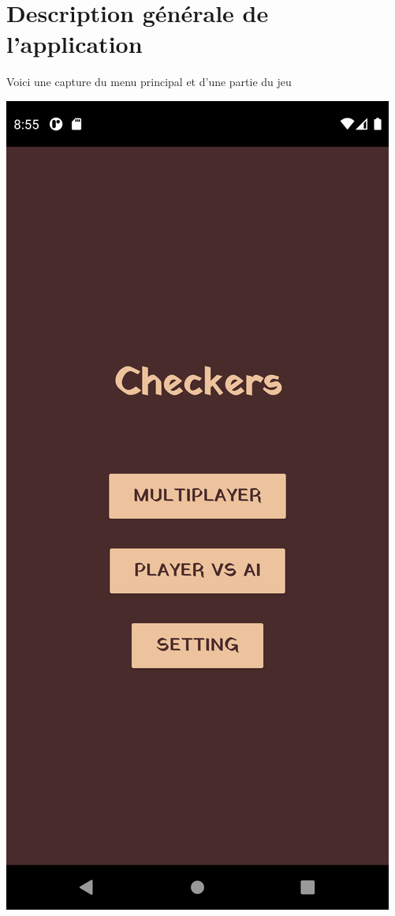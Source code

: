 \documentclass{article}
\begin{document}
\section{Description générale de l'application}

Voici une capture du menu principal et d'une partie du jeu

\begin{center}
  \includegraphics[scale=0.1]{menu_principal.png}

\end{center}
\end{document}
